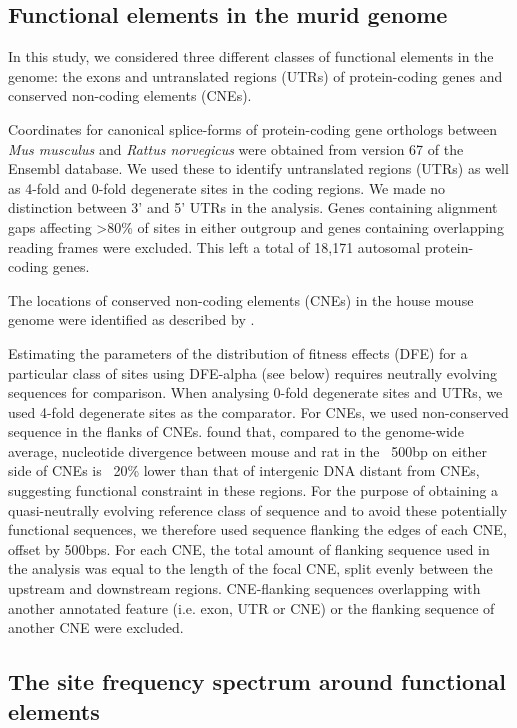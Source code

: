 \subsection{Functional elements in the murid genome}
        
	In this study, we considered three different classes of functional elements in the genome: the exons and untranslated regions (UTRs) of protein-coding genes and conserved non-coding elements (CNEs).

	Coordinates for canonical splice-forms of protein-coding gene orthologs between \textit{Mus musculus} and \textit{Rattus norvegicus} were obtained from version 67 of the Ensembl database. We used these to identify untranslated regions (UTRs) as well as 4-fold and 0-fold degenerate sites in the coding regions. We made no distinction between 3’ and 5’ UTRs in the analysis. Genes containing alignment gaps affecting >80\% of sites in either outgroup and genes containing overlapping reading frames were excluded. This left a total of 18,171 autosomal protein-coding genes.
 
	The locations of conserved non-coding elements (CNEs) in the house mouse genome were identified as described by \cite{RN122}. 

Estimating the parameters of the distribution of fitness effects (DFE) for a particular class of sites using DFE-alpha (see below) requires neutrally evolving sequences for comparison. When analysing 0-fold degenerate sites and UTRs, we used 4-fold degenerate sites as the comparator. For CNEs, we used non-conserved sequence in the flanks of CNEs. \citep{RN122} found that, compared to the genome-wide average, nucleotide divergence between mouse and rat in the ~500bp on either side of CNEs is ~20\% lower than that of intergenic DNA distant from CNEs, suggesting functional constraint in these regions. For the purpose of obtaining a quasi-neutrally evolving reference class of sequence and to avoid these potentially functional sequences, we therefore used sequence flanking the edges of each CNE, offset by 500bps. For each CNE, the total amount of flanking sequence used in the analysis was equal to the length of the focal CNE, split evenly between the upstream and downstream regions. CNE-flanking sequences overlapping with another annotated feature (i.e. exon, UTR or CNE) or the flanking sequence of another CNE were excluded.

\subsection{The site frequency spectrum around functional elements}
 
